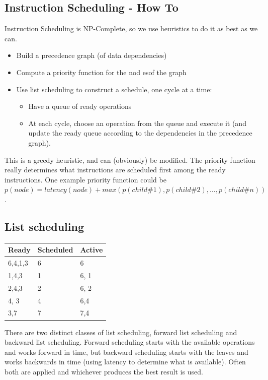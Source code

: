 \subsection{Instruction Scheduling - How To}

Instruction Scheduling is NP-Complete, so we use heuristics to do it as best as we can.

\begin{itemize}
        \item Build a precedence graph (of data dependencies)
        \item Compute a priority function for the nod esof the graph
        \item Use list scheduling to construct a schedule, one cycle at a time:
        \begin{itemize}
        \item Have a queue of ready operations
        \item At each cycle, choose an operation from the queue and execute
        it (and update the ready queue according to the dependencies in the precedence graph).
        \end{itemize}
\end{itemize}

This is a greedy heuristic, and can (obviously) be modified. The
priority function really determines what instructions are scheduled
first among the ready instructions. One example priority function
could be $p(node) = latency(node) + max(p(child\#1), p(child\#2),
\dots, p(child\#n))$.


\subsection{List scheduling}


\begin{tabular}{lll}
Ready & Scheduled & Active\\ \hline
6,4,1,3 & 6 & 6\\ \hline
1,4,3 & 1 & 6, 1\\ \hline
2,4,3 & 2 & 6, 2\\ \hline
4, 3 & 4 & 6,4\\ \hline
3,7 & 7 & 7,4 \\ \hline
\end{tabular}

There are two distinct classes of list scheduling, forward list
scheduling and backward list scheduling. Forward scheduling starts
with the available operations and works forward in time, but backward
scheduling starts with the leaves and works backwards in time (using
latency to determine what is available). Often both are applied and
whichever produces the best result is used.

